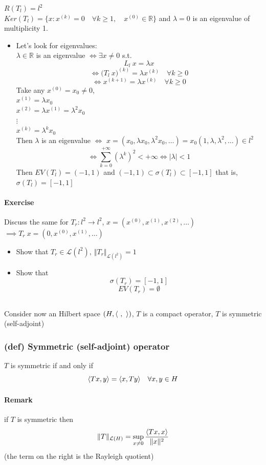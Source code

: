 $R(T_l)=l^2$\\
$Ker(T_l)=\{ x: x^{(k)}=0\quad \forall k\geq1,\quad x^{(0)}\in \mathbb R\}$
and $\lambda=0$ is an eigenvalue of multiplicity 1.
\begin{itemize}
    \item Let's look for eigenvalues:\\
    $\lambda \in \mathbb R$ is an eigenvalue $\iff \exists x\neq 0$ s.t.
    $$L_l\ x=\lambda x$$
    $$\iff \Big(T_l\ x\Big)^{(k)}=\lambda x^{(k)}\quad \forall k\geq 0$$
    $$\iff x^{(k+1)}=\lambda x^{(k)}\quad \forall k\geq 0$$
    Take any $x^{(0)}=x_0\neq0$,\\
    $x^{(1)}=\lambda x_0$\\
    $x^{(2)}=\lambda x^{(1)}=\lambda ^2x_0$\\
    $\vdots$\\
    $x^{(k)}=\lambda ^kx_0$\\
    Then $\lambda$ is an eigenvalue $\iff$ $x=(x_0,\lambda x_0,\lambda^2x_0,\dots)=x_0(1,\lambda,\lambda^2,\dots)\in l^2$
    $$\iff \sum_{k=0}^{+\infty}(\lambda^k)^2<+\infty \iff|\lambda|<1$$
    Then $EV(T_l)=(-1,1)$ and
    $(-1,1)\subset \sigma (T_l)\subset [-1,1]$ that is, $\sigma(T_l)=[-1,1]$
\end{itemize}
\paragraph{Exercise}
Discuss the same for $T_r:l^2\to l^2$, $x=(x^{(0)},x^{(1)},x^{(2)},\dots)$ $\implies T_r\ x=(0,x^{(0)},x^{(1)},\dots)$
\begin{itemize}
    \item Show that $T_r\in \mathcal L(l^2), \ \Vert T_r\Vert_{\mathcal L(l^2)}=1$
    \item Show that $$\sigma(T_r)=[-1,1]$$
    $$EV(T_r)=\emptyset$$
\end{itemize}
\subsection{}
Consider now an Hilbert space $(H,\scalar \ \ )$, $T$ is a compact operator, $T$ is symmetric (self-adjoint)
\subsubsection{(def) Symmetric (self-adjoint) operator}
$T$ is symmetric if and only if
$$\langle {Tx} , {y} \rangle=\langle {x} , {Ty} \rangle\quad \forall x,y\in H$$
\paragraph{Remark}
if $T$ is symmetric then
$$\Vert T\Vert _{\mathcal L(H)}=\sup_{x\neq 0}\frac{\langle {Tx} , {x} \rangle}{\Vert x\Vert^2}$$
(the term on the right is the Rayleigh quotient)
